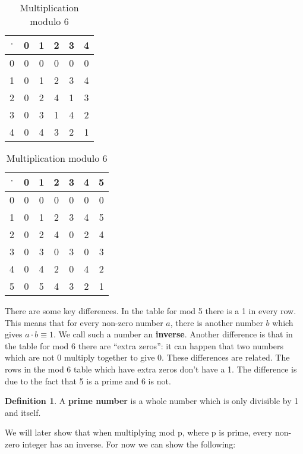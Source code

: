 \documentclass[12pt]{amsart}
\theoremstyle{definition}
\theoremstyle{definition}
\newtheorem{definition}{Definition}
\theoremstyle{remark}
\begin{document}
\begin{table}[!htb]
    \caption*{}
    \begin{minipage}{.5\linewidth}
      \caption*{Multiplication modulo $5$}
      \centering
\begin{tabular}{c||c|c|c|c|c}
$\cdot$&0&1&2&3&4\\
\hline\hline
0&0&0&0&0&0\\
\hline
1&0&1&2&3&4\\
\hline
2&0&2&4&1&3\\
\hline
3&0&3&1&4&2\\
\hline
4&0&4&3&2&1

        \end{tabular}
    \end{minipage}%
    \begin{minipage}{.5\linewidth}
      \centering
        \caption*{Multiplication modulo $6$}
\begin{tabular}{c||c|c|c|c|c|c}
$\cdot$&0&1&2&3&4&5\\
\hline\hline
0&0&0&0&0&0&0\\
\hline
1&0&1&2&3&4&5\\
\hline
2&0&2&4&0&2&4\\
\hline
3&0&3&0&3&0&3\\
\hline
4&0&4&2&0&4&2\\
\hline
5&0&5&4&3&2&1
        \end{tabular}
    \end{minipage} 
\end{table}


There are some key differences. In the table for mod 5 there is a 1 in every row. This means that for every non-zero number $a$, there is another number $b$ which gives $a\cdot b \equiv 1$. We call such a number an \textbf{inverse}. Another difference is that in the table for mod 6 there are ``extra zeros'': it can happen that two numbers which are not 0 multiply together to give 0. These differences are related. The rows in the mod 6 table which have extra zeros don't have a 1. The difference is due to the fact that 5 is a prime and 6 is not. 

\begin{definition}
A \textbf{prime number} is a whole number which is only divisible by 1 and itself.
\end{definition}

We will later show that when multiplying mod p, where p is prime, every non-zero integer has an inverse. For now we can show the following:
\end{document}
